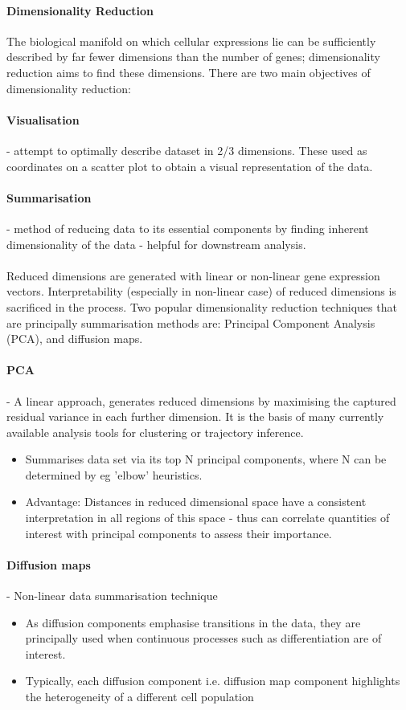\documentclass[a4paper,12pt]{article}
\begin{document}
\paragraph{Dimensionality Reduction}
The biological manifold on which cellular expressions lie can be sufficiently described by far fewer dimensions than the number of genes; dimensionality reduction aims to find these dimensions.
There are two main objectives of dimensionality reduction:
\paragraph{Visualisation} - attempt to optimally describe dataset in 2/3 dimensions. These used as coordinates on a scatter plot to obtain a visual representation of the data.
\paragraph{Summarisation}- method of reducing data to its essential components by finding inherent dimensionality of the data - helpful for downstream analysis.
\paragraph{}
Reduced dimensions are generated with linear or non-linear gene expression vectors. Interpretability (especially in non-linear case) of reduced dimensions is sacrificed in the process.
Two popular dimensionality reduction techniques that are principally summarisation methods are: Principal Component Analysis (PCA),  and diffusion maps.
\paragraph{PCA} - A linear approach, generates reduced dimensions by maximising the captured residual variance in each further dimension.  It is the basis of many currently available analysis tools for clustering or trajectory inference.
\begin{itemize}
\item Summarises  data set via its top N principal components, where N can be determined by eg 'elbow' heuristics.
\item Advantage: Distances in reduced dimensional space have a consistent interpretation in all regions of this space - thus can correlate quantities of interest with principal components to assess their importance.
\end{itemize}
\paragraph{Diffusion maps} - Non-linear data summarisation technique
\begin{itemize} 
\item As diffusion components emphasise transitions in the data, they are principally used when continuous processes such as differentiation are of interest.
\item Typically, each diffusion component i.e. diffusion map component highlights the heterogeneity of a different cell population
\end{itemize}
\end{document}

